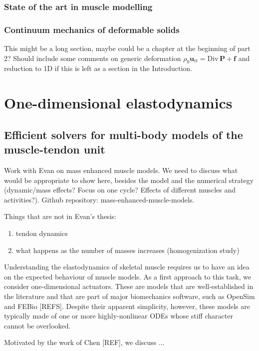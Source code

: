 \documentclass{sfuthesis}
\numberwithin{equation}{chapter}
\numberwithin{figure}{chapter}
\numberwithin{table}{chapter}
\theoremstyle{definition}
\def\*#1{{\mathbf{#1}}} %
\newcommand{\Divt}[1]{{\bm{\mathrm{Div}} \, #1}}
\begin{document}
\section{State of the art in muscle modelling}

\section{Continuum mechanics of deformable solids}

This might be a long section, maybe could be a chapter at the beginning of part 2? Should include some comments on generic deformation $\rho_0 \*u_{tt} = \Divt{\*P} + \*f$ and reduction to 1D if this is left as a section in the Introduction.

\part{One-dimensional elastodynamics}

\chapter{Efficient solvers for multi-body models of the muscle-tendon unit}

Work with Evan on mass enhanced muscle models. We need to discuss what would be appropriate to show here, besides the model and the numerical strategy (dynamic/mass effects? Focus on one cycle? Effects of different muscles and activities?).
Github repository: mass-enhanced-muscle-models.

\medskip

Things that are not in Evan's thesis:
\begin{enumerate}
    \item tendon dynamics
    \item what happens as the number of masses increases (homogenization study)
\end{enumerate}

Understanding the elastodynamics of skeletal muscle requires us to have an idea on the expected behaviour of muscle models. As a first approach to this task, we consider one-dimensional actuators. These are models that are well-established in the literature and that are part of major biomechanics software, such as OpenSim and FEBio [REFS]. Despite their apparent simplicity, however, these models are typically made of one or more highly-nonlinear ODEs whose stiff character cannot be overlooked. 

Motivated by the work of Chen [REF], we discuss ... 
\end{document}
